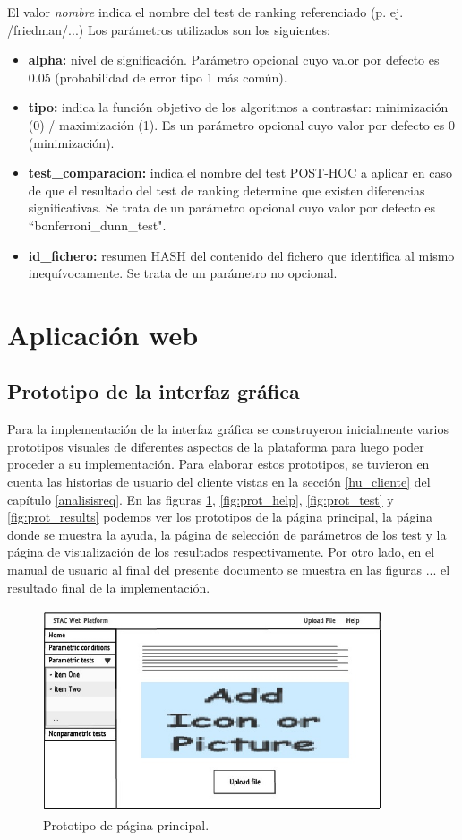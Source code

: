 El valor \textit{nombre} indica el nombre del test de ranking referenciado (p. ej. /friedman/...) Los parámetros utilizados son los siguientes:
\begin{itemize}
\item \textbf{alpha:} nivel de significación. Parámetro opcional cuyo valor por defecto es 0.05 (probabilidad de error tipo 1 más común).
\item \textbf{tipo:} indica la función objetivo de los algoritmos a contrastar: minimización (0) / maximización (1). Es un parámetro opcional cuyo valor por defecto es 0 (minimización).
\item \textbf{test\_comparacion:} indica el nombre del test POST-HOC a aplicar en caso de que el resultado del test de ranking determine que existen diferencias significativas. Se trata de un parámetro opcional cuyo valor por defecto es ``bonferroni\_dunn\_test".
\item \textbf{id\_fichero:} resumen HASH del contenido del fichero que identifica al mismo inequívocamente. Se trata de un parámetro no opcional.
\end{itemize}

\section{Aplicación web}
\subsection{Prototipo de la interfaz gráfica}
Para la implementación de la interfaz gráfica se construyeron inicialmente varios prototipos visuales de diferentes aspectos de la plataforma para luego poder proceder a su implementación. Para elaborar estos prototipos, se tuvieron en cuenta las historias de usuario del cliente vistas en la sección \ref{hu_cliente} del capítulo \ref{analisisreq}. En las figuras \ref{fig:prot_home}, \ref{fig:prot_help}, \ref{fig:prot_test} y \ref{fig:prot_results} podemos ver los prototipos de la página principal, la página donde se muestra la ayuda, la página de selección de parámetros de los test y la página de visualización de los resultados respectivamente. Por otro lado, en el manual de usuario al final del presente documento se muestra en las figuras ... el resultado final de la implementación.

\begin{figure}[H]
\centering
\includegraphics[width=10cm,height=6cm]{figuras/prototipo_home.jpg}
\caption{Prototipo de página principal.}
\label{fig:prot_home}
\end{figure}


